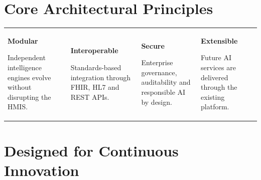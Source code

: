 \section{Core Architectural Principles}

\begin{center}

\begin{tabularx}{\textwidth}{XXXX}

\begin{partnerbox}

\centering

{\Large\textbf{Modular}}

Independent intelligence engines evolve without disrupting the HMIS.

\end{partnerbox}

&

\begin{partnerbox}

\centering

{\Large\textbf{Interoperable}}

Standards-based integration through FHIR, HL7 and REST APIs.

\end{partnerbox}

&

\begin{partnerbox}

\centering

{\Large\textbf{Secure}}

Enterprise governance, auditability and responsible AI by design.

\end{partnerbox}

&

\begin{partnerbox}

\centering

{\Large\textbf{Extensible}}

Future AI services are delivered through the existing platform.

\end{partnerbox}

\end{tabularx}

\end{center}


\section{Designed for Continuous Innovation}

